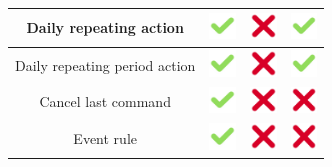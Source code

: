 \documentclass[runningheads]{llncs}
\begin{document}
\begin{table}
\begin{tabular}{ | c | c | c | c |}
    Daily repeating action &
    \includegraphics[width=20pt]{figures/checkmark} & 
    \includegraphics[width=20pt]{figures/cross} &
    \includegraphics[width=20pt]{figures/checkmark} \\ \hline
    
    Daily repeating period action &
    \includegraphics[width=20pt]{figures/checkmark} & 
    \includegraphics[width=20pt]{figures/cross} &
    \includegraphics[width=20pt]{figures/checkmark} \\ \hline
    
    Cancel last command &
    \includegraphics[width=20pt]{figures/checkmark} & 
    \includegraphics[width=20pt]{figures/cross} &
    \includegraphics[width=20pt]{figures/cross} \\ \hline
    
    Event rule &
    \includegraphics[width=20pt]{figures/checkmark} & 
    \includegraphics[width=20pt]{figures/cross} &
    \includegraphics[width=20pt]{figures/cross} \\ \hline
    

\end{tabular}
\end{table}
\end{document}
